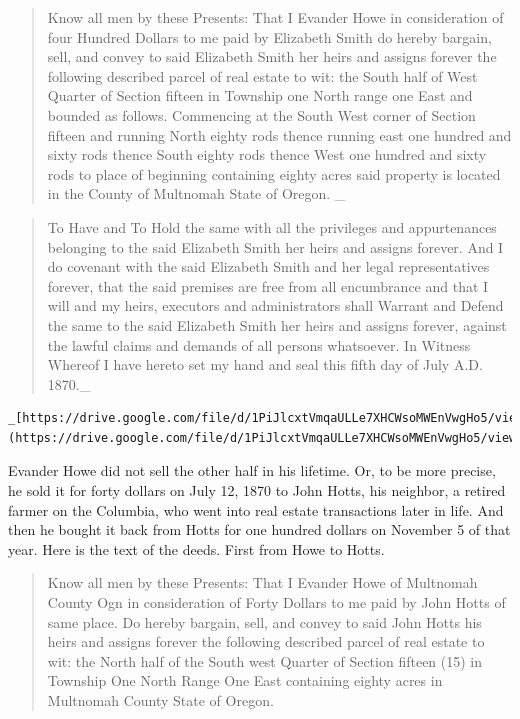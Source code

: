 \documentclass[
  12pt,
]{book}
\begin{document}
\begin{quote}
Know all men by these Presents: That I Evander Howe in consideration of four Hundred Dollars to me paid by Elizabeth Smith do hereby bargain, sell, and convey to said Elizabeth Smith her heirs and assigns forever the following described parcel of real estate to wit: the South half of West Quarter of Section fifteen in Township one North range one East and bounded as follows. Commencing at the South West corner of Section fifteen and running North eighty rods thence running east one hundred and sixty rods thence South eighty rods thence West one hundred and sixty rods to place of beginning containing eighty acres said property is located in the County of Multnomah State of Oregon. \_
\end{quote}

\begin{quote}
To Have and To Hold the same with all the privileges and appurtenances belonging to the said Elizabeth Smith her heirs and assigns forever. And I do covenant with the said Elizabeth Smith and her legal representatives forever, that the said premises are free from all encumbrance and that I will and my heirs, executors and administrators shall Warrant and Defend the same to the said Elizabeth Smith her heirs and assigns forever, against the lawful claims and demands of all persons whatsoever. In Witness Whereof I have hereto set my hand and seal this fifth day of July A.D. 1870.\_
\end{quote}

\begin{verbatim}
_[https://drive.google.com/file/d/1PiJlcxtVmqaULLe7XHCWsoMWEnVwgHo5/view](https://drive.google.com/file/d/1PiJlcxtVmqaULLe7XHCWsoMWEnVwgHo5/view)_
\end{verbatim}

Evander Howe did not sell the other half in his lifetime. Or, to be more precise, he sold it for forty dollars on July 12, 1870 to John Hotts, his neighbor, a retired farmer on the Columbia, who went into real estate transactions later in life. And then he bought it back from Hotts for one hundred dollars on November 5 of that year. Here is the text of the deeds. First from Howe to Hotts.

\begin{quote}
Know all men by these Presents: That I Evander Howe of Multnomah County Ogn in consideration of Forty Dollars to me paid by John Hotts of same place. Do hereby bargain, sell, and convey to said John Hotts his heirs and assigns forever the following described parcel of real estate to wit: the North half of the South west Quarter of Section fifteen (15) in Township One North Range One East containing eighty acres in Multnomah County State of Oregon.
\end{quote}
\end{document}

